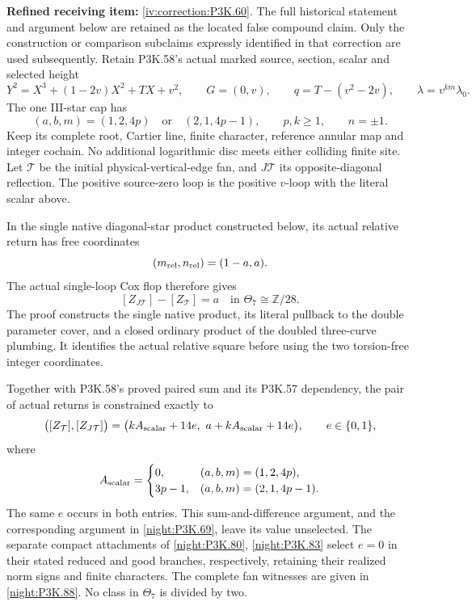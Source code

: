 \begin{theorem}\hypertarget{tag-02V7}{}\label{night:P3K.60}

\par\noindent\textbf{Refined receiving item:} \cref{iv:correction:P3K.60}. The full historical statement and argument below are retained as the located false compound claim. Only the construction or comparison subclaims expressly identified in that correction are used subsequently.
Retain P3K.58's actual marked source, section, scalar and selected height
\[
 Y^2=X^3+(1-2v)X^2+TX+v^2,\qquad G=(0,v),\qquad
 q=T-(v^2-2v),\qquad \lambda=v^{km}\lambda_0 .
\]
The one III-star cap has
\[
 (a,b,m)=(1,2,4p)\quad\text{or}\quad(2,1,4p-1),
 \qquad p,k\ge1,\qquad n=\pm1 .
\]
Keep its complete root, Cartier line, finite character, reference
annular map and integer cochain. No additional logarithmic disc
meets either colliding finite site. Let \(\mathcal T\) be the initial
physical-vertical-edge fan, and \(J\mathcal T\) its opposite-diagonal
reflection. The positive source-zero loop is the positive \(v\)-loop
with the literal scalar above.

In the single native diagonal-star product constructed below, its
actual relative return has free coordinates
\[
                              (m_{\rm rel},n_{\rm rel})=(1-a,a).
\]
The actual single-loop Cox flop therefore gives
\[
                   [Z_{J\mathcal T}]-[Z_{\mathcal T}]
                                  =a\quad\text{in }\Theta_7\cong\mathbb Z/28.
\]
The proof constructs the single native product, its literal pullback
to the double parameter cover, and a closed ordinary product of
the doubled three-curve plumbing. It identifies the actual relative
square before using the two torsion-free integer coordinates.

Together with P3K.58's proved paired sum and its P3K.57 dependency,
the pair of actual returns is constrained exactly to
\[
 \bigl([Z_{\mathcal T}],[Z_{J\mathcal T}]\bigr)
   =\bigl(kA_{\rm scalar}+14e,\ a+kA_{\rm scalar}+14e\bigr),
       \qquad e\in\{0,1\},
\]
where
\[
 A_{\rm scalar}=
 \begin{cases}
 0,&(a,b,m)=(1,2,4p),\\
 3p-1,&(a,b,m)=(2,1,4p-1).
 \end{cases}
\]
The same \(e\) occurs in both entries. This sum-and-difference
argument, and the corresponding argument in \cref{night:P3K.69},
leave its value unselected. The separate compact attachments of
\cref{night:P3K.80}, \cref{night:P3K.83} select \(e=0\) in their stated
reduced and good branches, respectively, retaining their realized
norm signs and finite characters. The complete fan witnesses are
given in \cref{night:P3K.88}. No class in \(\Theta_7\) is divided by two.
\end{theorem}


